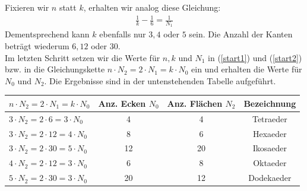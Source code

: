 Fixieren wir $n$ statt $k$, erhalten wir analog diese Gleichung:
\begin{align}
\frac{1}{k}- \frac{1}{6}= \frac{1}{N_1} \label{nfix}
\end{align}
 Dementsprechend kann $k$ ebenfalls nur $3,4$ oder $5$ sein. Die Anzahl der Kanten beträgt wiederum $6, 12$ oder $30$.\\
Im letzten Schritt setzen wir die Werte für $n,k$ und $N_1$ in (\ref{start1}) und (\ref{start2}) bzw. in die Gleichungskette $n\cdot N_2=2\cdot N_1=k\cdot N_0$ ein und erhalten die Werte für $N_0$ und $N_2$. Die Ergebnisse sind in der untenstehenden Tabelle aufgeführt.
\begin{center}
\begin{tabular}{p{4.5cm}|c|c|c}
$n\cdot N_2=2\cdot N_1=k\cdot N_0$ & Anz. Ecken $N_0$& Anz. Flächen $N_2$& Bezeichnung\\ \hline
$3 \cdot N_2=2 \cdot 6=3 \cdot N_0$& 4 & 4 & Tetraeder\\ \hline
$3\cdot N_2=2 \cdot 12=4\cdot N_0$& 8 & 6 & Hexaeder \\ \hline
$3\cdot N_2=2 \cdot 30=5\cdot N_0$& 12 & 20 & Ikosaeder\\ \hline
$4\cdot N_2=2 \cdot 12=3\cdot N_0$& 6 & 8 & Oktaeder \\ \hline
$5\cdot N_2=2 \cdot 30=3\cdot N_0$& 20 & 12 & Dodekaeder

\end{tabular}
\end{center}
